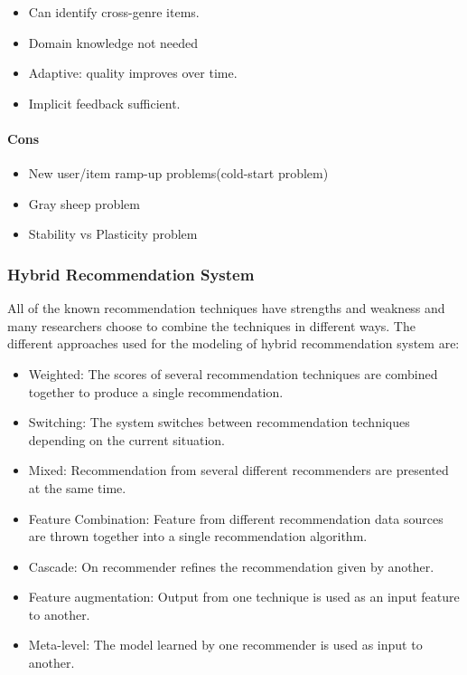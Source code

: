 \begin{itemize}
	\item Can identify cross-genre items.
	\item Domain knowledge not needed
	\item Adaptive: quality improves over time.
	\item Implicit feedback sufficient.
\end{itemize}
\paragraph{Cons}\hfill

\begin{itemize}
	\item New user/item ramp-up problems(cold-start problem)
	\item Gray sheep problem
	\item Stability vs Plasticity problem
\end{itemize}
\subsubsection{Hybrid Recommendation System}
All of the known recommendation techniques have strengths and weakness and many researchers choose to combine the techniques in different ways.
The different approaches used for the modeling of hybrid recommendation system are:
\begin{itemize}
	\item Weighted: The scores of several recommendation techniques are combined together to produce a single recommendation.
	\item Switching: The system switches between recommendation techniques depending on the current situation.
	\item Mixed: Recommendation from several different recommenders are presented at the same time.
	\item Feature Combination: Feature from different recommendation data sources are thrown together into a single recommendation algorithm.
	\item Cascade: On recommender refines the recommendation given by another.
	\item Feature augmentation: Output from one technique is used as an input feature to another.
	\item Meta-level: The model learned by one recommender is used as input to another.
\end{itemize}

